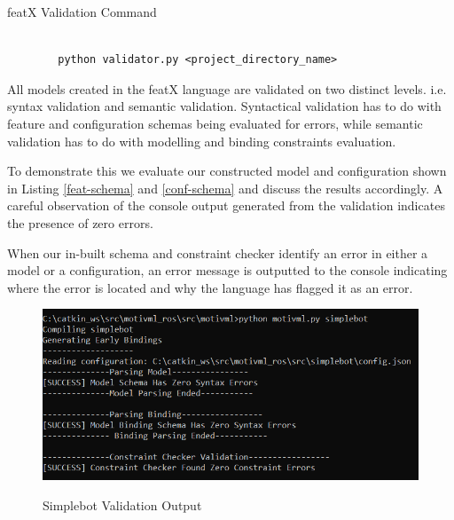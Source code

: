 \documentclass{article}
\newenvironment{longlisting}{\captionsetup{type=listing}}{}
\begin{document}
\begin{longlisting}
	\caption{featX Validation Command}
	\begin{verbatim}
		
		python validator.py <project_directory_name>

	\end{verbatim}
\label{valcomm}
\end{longlisting}

All models created in the featX language are validated on two distinct levels. i.e. syntax validation and semantic validation. Syntactical validation has to do with feature and configuration schemas being evaluated for errors, while semantic validation has to do with modelling and binding constraints evaluation.

To demonstrate this we evaluate our constructed model and configuration shown in Listing \ref{feat-schema} and \ref{conf-schema} and discuss the results accordingly. A careful observation of  the console output generated from the validation indicates the presence of zero errors.

When our in-built schema and constraint checker identify an error in either a model or a configuration, an error message is outputted to the console indicating where the error is located and why the language has flagged it as an error.

\begin{figure}[H]
	\caption{Simplebot Validation Output}
	\centering
	\includegraphics[width=0.7\columnwidth]{images/validate.png}
	\label{validation}
\end{figure}
\end{document}
